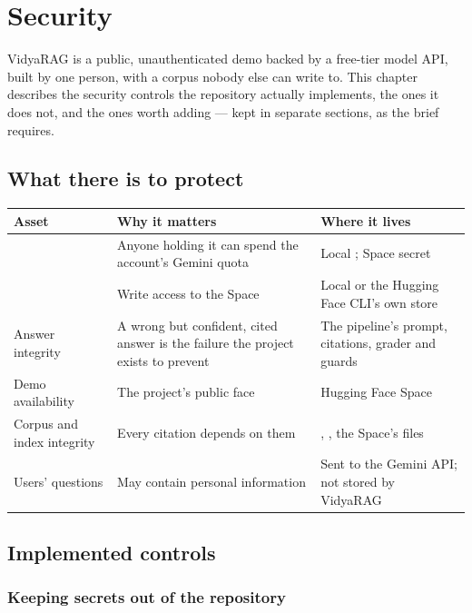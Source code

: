 \chapter{Security}
\label{ch:security}

VidyaRAG is a public, unauthenticated demo backed by a free-tier model API, built by one person, with a corpus nobody else can write to. This chapter describes the security controls the repository actually implements, the ones it does not, and the ones worth adding --- kept in separate sections, as the brief requires.

\section{What there is to protect}

\begin{center}
\begin{tabularx}{\textwidth}{@{}>{\raggedright\arraybackslash}p{3.6cm}LL@{}}
\toprule
\textbf{Asset} & \textbf{Why it matters} & \textbf{Where it lives}\\
\midrule
{} & Anyone holding it can spend the account's Gemini quota & Local ; Space secret\\
 & Write access to the Space & Local  or the Hugging Face CLI's own store\\
Answer integrity & A wrong but confident, cited answer is the failure the project exists to prevent & The pipeline's prompt, citations, grader and guards\\
Demo availability & The project's public face & Hugging Face Space\\
Corpus and index integrity & Every citation depends on them & , , the Space's files\\
Users' questions & May contain personal information & Sent to the Gemini API; not stored by VidyaRAG\\
\bottomrule
\end{tabularx}
\end{center}

\section{Implemented controls}
\label{sec:sec-implemented}

\subsection{Keeping secrets out of the repository}

